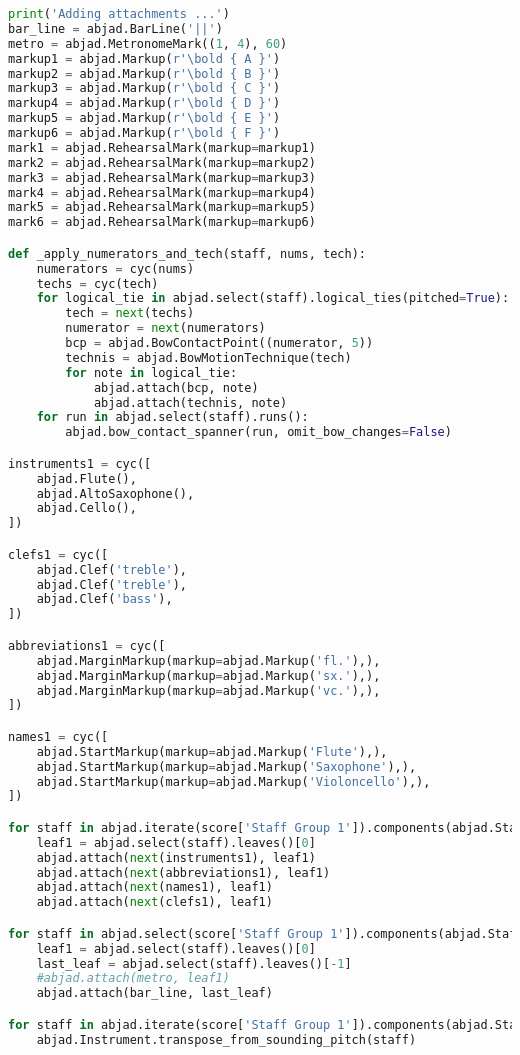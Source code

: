 \begin{lstlisting}[language=Python, caption=Four Ages of Sand Segment\_II]
print('Adding attachments ...')
bar_line = abjad.BarLine('||')
metro = abjad.MetronomeMark((1, 4), 60)
markup1 = abjad.Markup(r'\bold { A }')
markup2 = abjad.Markup(r'\bold { B }')
markup3 = abjad.Markup(r'\bold { C }')
markup4 = abjad.Markup(r'\bold { D }')
markup5 = abjad.Markup(r'\bold { E }')
markup6 = abjad.Markup(r'\bold { F }')
mark1 = abjad.RehearsalMark(markup=markup1)
mark2 = abjad.RehearsalMark(markup=markup2)
mark3 = abjad.RehearsalMark(markup=markup3)
mark4 = abjad.RehearsalMark(markup=markup4)
mark5 = abjad.RehearsalMark(markup=markup5)
mark6 = abjad.RehearsalMark(markup=markup6)

def _apply_numerators_and_tech(staff, nums, tech):
    numerators = cyc(nums)
    techs = cyc(tech)
    for logical_tie in abjad.select(staff).logical_ties(pitched=True):
        tech = next(techs)
        numerator = next(numerators)
        bcp = abjad.BowContactPoint((numerator, 5))
        technis = abjad.BowMotionTechnique(tech)
        for note in logical_tie:
            abjad.attach(bcp, note)
            abjad.attach(technis, note)
    for run in abjad.select(staff).runs():
        abjad.bow_contact_spanner(run, omit_bow_changes=False)

instruments1 = cyc([
    abjad.Flute(),
    abjad.AltoSaxophone(),
    abjad.Cello(),
])

clefs1 = cyc([
    abjad.Clef('treble'),
    abjad.Clef('treble'),
    abjad.Clef('bass'),
])

abbreviations1 = cyc([
    abjad.MarginMarkup(markup=abjad.Markup('fl.'),),
    abjad.MarginMarkup(markup=abjad.Markup('sx.'),),
    abjad.MarginMarkup(markup=abjad.Markup('vc.'),),
])

names1 = cyc([
    abjad.StartMarkup(markup=abjad.Markup('Flute'),),
    abjad.StartMarkup(markup=abjad.Markup('Saxophone'),),
    abjad.StartMarkup(markup=abjad.Markup('Violoncello'),),
])

for staff in abjad.iterate(score['Staff Group 1']).components(abjad.Staff):
    leaf1 = abjad.select(staff).leaves()[0]
    abjad.attach(next(instruments1), leaf1)
    abjad.attach(next(abbreviations1), leaf1)
    abjad.attach(next(names1), leaf1)
    abjad.attach(next(clefs1), leaf1)

for staff in abjad.select(score['Staff Group 1']).components(abjad.Staff)[0]:
    leaf1 = abjad.select(staff).leaves()[0]
    last_leaf = abjad.select(staff).leaves()[-1]
    #abjad.attach(metro, leaf1)
    abjad.attach(bar_line, last_leaf)

for staff in abjad.iterate(score['Staff Group 1']).components(abjad.Staff):
    abjad.Instrument.transpose_from_sounding_pitch(staff)


\end{lstlisting}
